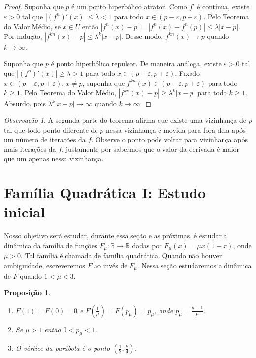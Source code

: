 \documentclass[a4paper, 12pt]{article}
\theoremstyle{definition}
\theoremstyle{plain}
\newtheorem{proposition}[definition]{Proposição}
\theoremstyle{plain}
\theoremstyle{plain}
\theoremstyle{remark}
\newtheorem*{remark}{Observação}
\newcommand{\RR}{\mathbb{R}}
\begin{document}
\begin{proof}
Suponha que $p$ é um ponto hiperbólico atrator. Como $f'$ é contínua, existe $\varepsilon > 0$ tal que $|(f^n)'(x)| \leq \lambda < 1$ para todo $x \in (p - \varepsilon, p + \varepsilon)$. Pelo Teorema do Valor Médio, se $x \in U$ então $|f^n(x) - p| = |f^n(x) - f^n(p)| \leq \lambda|x - p|$. Por indução, $|f^{kn}(x) - p| \leq \lambda^k|x - p|$. Desse modo, $f^{kn}(x) \longrightarrow p$ quando $k \longrightarrow \infty$.

Suponha que $p$ é ponto hiperbólico repulsor. De maneira análoga, existe $\varepsilon > 0$ tal que $|(f^n)'(x)| \geq \lambda > 1$ para todo $x \in (p- \varepsilon, p + \varepsilon)$. Fixado $x \in (p - \varepsilon, p + \varepsilon)$, $x \neq p$, suponha que $f^{kn}(x) \in (p - \varepsilon, p + \varepsilon)$ para todo $k \geq 1$. Pelo Teorema do Valor Médio, $|f^{kn}(x) - p| \geq \lambda^k|x - p|$ para todo $k \geq 1$. Absurdo, pois $\lambda^k|x - p| \longrightarrow \infty$ quando $k \longrightarrow \infty$.
\end{proof}

\begin{remark}
A segunda parte do teorema afirma que existe uma vizinhança de $p$ tal que todo ponto diferente de $p$ nessa vizinhança é movida para fora dela após um número de iterações da $f$. Observe o ponto pode voltar para vizinhança após mais iterações da $f$, justamente por sabermos que o valor da derivada é maior que um apenas nessa vizinhança.
\end{remark}

\section{Família Quadrática I: Estudo inicial}

Nosso objetivo será estudar, durante essa seção e as próximas, é estudar a dinâmica da família de funções $F_{\mu}: \RR \rightarrow \RR$ dadas por $F_{\mu}(x) = \mu x(1-x)$, onde $\mu > 0$. Tal família é chamada de família quadrática. Quando não houver ambiguidade, escreveremos $F$ ao invés de $F_\mu$. Nessa seção estudaremos a dinâmica de $F$ quando $1 < \mu < 3$.

\begin{proposition}
\begin{enumerate}
\item $F (1) = F(0) = 0$ e $F(\frac{1}{\mu}) = F(p_\mu) = p_\mu$, onde $p_\mu = \frac{\mu - 1}{\mu}$.
\item Se $\mu > 1$ então $0 < p_\mu < 1$.
\item O vértice da parábola é o ponto $(\frac{1}{2}, \frac{\mu}{4})$.
\end{enumerate}
\end{proposition}
\end{document}
